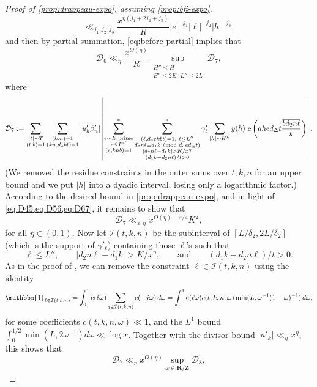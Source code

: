 \documentclass[reqno,11pt]{amsart}
\theoremstyle{definition}
\theoremstyle{remark}
\numberwithin{equation}{section}
\newcommand{\Z}{\mathbf{Z}}
\newcommand{\R}{\mathbf{R}}
\newcommand{\mD}{\mathcal{D}}
\newcommand{\mI}{\mathcal{I}}
\newcommand{\e}{\textnormal{e}}
\newcommand{\one}{\mathbbm{1}}
\newcommand{\eps}{\varepsilon}
\renewcommand{\bar}{\overline}
\renewcommand{\pmod}[1]{\ (\textnormal{mod } #1)}
\begin{document}
\begin{proof}[Proof of \cref{prop:drappeau-expo}, assuming \cref{prop:bfi-expo}]
\[    \ll_{j_1, j_2, j_3}
    \frac{x^{\eta(j_1 + 2j_2 + j_3)}}{R} |e|^{-j_1} |\ell|^{-j_2} |h|^{-j_3},
\]
and then by partial summation, \cref{eq:before-partial} implies that
\begin{equation} \label{eq:D67}
    \mD_6 \ll_\eta \frac{x^{O(\eta)}}{R} \sup_{\substack{H'' \le H \\ E'' \le 2E,\ L'' \le 2L}} \mD_7,
\end{equation}
where
\[
    \mD_7 := \sum_{\substack{|t| \sim T \\ (t, b) = 1}} \sum_{\substack{(k, n) = 1 \\ (kn, d_abt) = 1}} |u'_k \beta'_n| \left\vert
    \sum^*_{\substack{e \sim E \text{ prime} \\ e \le E'' \\ (e, knb) = 1}} 
    \sum^*_{\substack{(\ell, d_aekbt) = 1,\ \ell \le L'' \\ d_2 n \ell \equiv d_1 k \pmod{d_aed_\Delta t} \\ |d_2 n \ell - d_1 k| > K/x^\eta \\ (d_1 k - d_2 n \ell)/t > 0}} \gamma'_\ell
    \sum_{|h| \sim H''} 
    y(h)\ \e\left(ahe d_\Delta t \frac{\bar{b d_2n \ell}}{k}\right)
    \right\vert.
\]
(We removed the residue constraints in the outer sums over $t, k, n$ for an upper bound and we put $|h|$ into a dyadic interval, losing only a logarithmic factor.) According to the desired bound in \cref{prop:drappeau-expo}, and in light of \cref{eq:D45,eq:D56,eq:D67}, it remains to show that
\begin{equation} \label{eq:B-bound}
    \mD_7 \ll_{\eps,\eta} x^{O(\eta)-\eps/4} K^2,
\end{equation}
for all $\eta \in (0, 1)$. Now let $\mI(t, k, n)$ be the subinterval of $[L/\delta_2, 2L/\delta_2]$ (which is the support of $\gamma'_\ell$) containing those $\ell$'s such that
\[
    \ell \le L'', \qquad |d_2 n \ell - d_1 k| > K/x^\eta, \qquad 
    \text{and} \qquad 
    (d_1 k - d_2 n \ell)/t > 0.
\]
As in the proof of \cite[Lemma 18.4]{maynard2020primes}, we can remove the constraint $\ell \in \mI(t, k, n)$ using the identity
\[
    \one_{\ell \in \mI(t, k, n)} = 
    \int_0^1 \e(\ell \omega) \sum_{j \in \mI(t, k, n)} \e(-j\omega)\, d\omega
    =
    \int_0^1 \e(\ell \omega) c(t, k, n, \omega)\min(L, \omega^{-1} (1 - \omega)^{-1}) \,d\omega,
\]
for some coefficients $c(t, k, n, \omega) \ll 1$, and the $L^1$ bound $\int_0^{1/2} \min(L, 2\omega^{-1}) d\omega \ll \log x$. Together with the divisor bound $|u'_k| \ll_\eta x^\eta$, this shows that
\[
    \mD_7 \ll_\eta x^{O(\eta)} \sup_{\omega \in \R/\Z} \mD_8,
\]
\end{proof}
\end{document}
